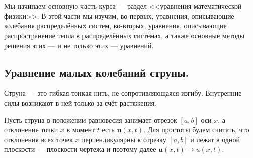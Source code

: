 	\chapter{}
\label{lecture11}

Мы начинаем основную часть курса --- раздел <<уравнения математической физики>>. В этой части мы изучим, во-первых, уравнения, описывающие колебания распределённых систем, во-вторых, уравнения, описывающие распространение тепла в распределённых системах, а также основные методы решения этих --- и не только этих --- уравнений.

\section{Уравнение малых колебаний струны.}
\label{lecture11section1}

\begin{_def}
	Струна --- это гибкая тонкая нить, не сопротивляющаяся изгибу. Внутренние силы возникают в ней только за счёт растяжения.
\end{_def}
Пусть струна в положении равновесия занимает отрезок $[a,b]$ оси $x$, а отклонение точки $x$ в момент $t$ есть $\bm{u}(x,t)$. Для простоты будем считать, что отклонения всех точек $x$ перпендикулярны к отрезку $[a,b]$ и лежат в одной плоскости --- плоскости чертежа и поэтому далее $\bm{u}(x,t)\rightarrow u(x,t)$.


